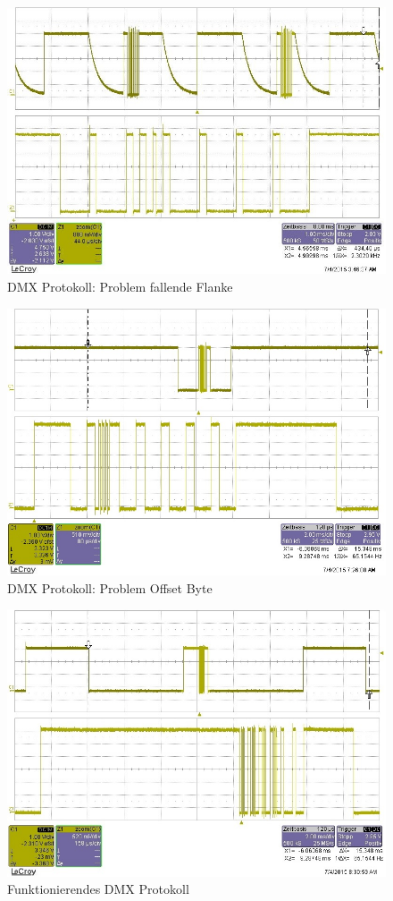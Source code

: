 \begin{figure}[H]
	\includegraphics[scale=0.7]{chapters/userapplication/figures/DMX-Edge}
	\caption{DMX Protokoll: Problem fallende Flanke}
	\label{fig:DMX-Edge}
\end{figure}

\begin{figure}[H]
	\includegraphics[scale=0.7]{chapters/userapplication/figures/DMX-Offset-Byte}
	\caption{DMX Protokoll: Problem Offset Byte}
	\label{fig:DMX-Offset-Byte}
\end{figure}

\begin{figure}[H]
	\includegraphics[scale=0.7]{chapters/userapplication/figures/DMX}
	\caption{Funktionierendes DMX Protokoll}
	\label{fig:DMX}
\end{figure}

\pagebreak 